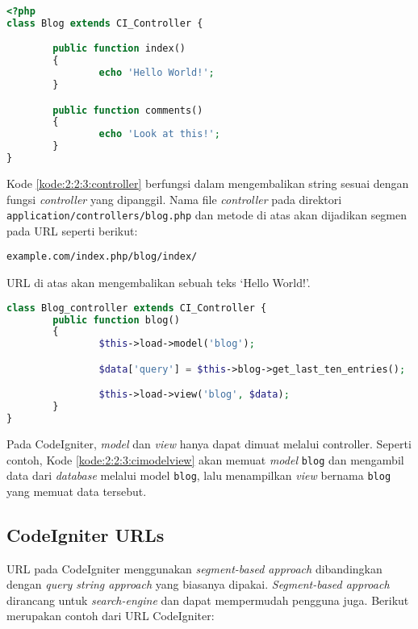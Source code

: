 \begin{lstlisting}[language=php, caption={Contoh \textit{controller}}, label={kode:2:2:3:controller}]
<?php
class Blog extends CI_Controller {

		public function index()
		{
				echo 'Hello World!';
		}

		public function comments()
		{
				echo 'Look at this!';
		}
}
\end{lstlisting}

Kode \ref{kode:2:2:3:controller} berfungsi dalam mengembalikan string sesuai dengan fungsi \textit{controller} yang dipanggil. Nama file \textit{controller} pada direktori \verb|application/controllers/blog.php| dan metode di atas akan dijadikan segmen pada URL seperti berikut:

\begin{center}
	\verb|example.com/index.php/blog/index/|
\end{center}

URL di atas akan mengembalikan sebuah teks `Hello World!'.

\begin{lstlisting}[language=php, caption=Contoh memuat \textit{model} dan menampilkan \textit{view}, label=kode:2:2:3:cimodelview]
class Blog_controller extends CI_Controller {
		public function blog()
		{
				$this->load->model('blog');

				$data['query'] = $this->blog->get_last_ten_entries();

				$this->load->view('blog', $data);
		}
}
\end{lstlisting}

Pada CodeIgniter, \textit{model} dan \textit{view} hanya dapat dimuat melalui controller. Seperti contoh, Kode \ref{kode:2:2:3:cimodelview} akan memuat \textit{model} \verb|blog| dan mengambil data dari \textit{database} melalui model \verb|blog|, lalu menampilkan \textit{view} bernama \verb|blog| yang memuat data tersebut.

\subsection{CodeIgniter URLs}
\label{sub:2:2:codeigniterurls}

URL pada CodeIgniter menggunakan \textit{segment-based approach} dibandingkan dengan \textit{query string approach} yang biasanya dipakai. \textit{Segment-based approach} dirancang untuk \textit{search-engine} dan dapat mempermudah pengguna juga. Berikut merupakan contoh dari URL CodeIgniter:

